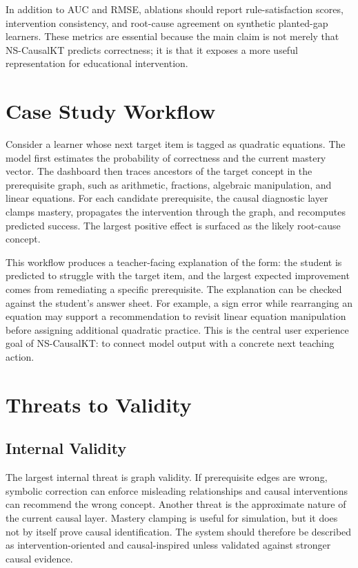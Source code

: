 \documentclass[conference]{IEEEtran}
\begin{document}
In addition to AUC and RMSE, ablations should report rule-satisfaction scores, intervention consistency, and root-cause agreement on synthetic planted-gap learners. These metrics are essential because the main claim is not merely that NS-CausalKT predicts correctness; it is that it exposes a more useful representation for educational intervention.

\section{Case Study Workflow}
Consider a learner whose next target item is tagged as quadratic equations. The model first estimates the probability of correctness and the current mastery vector. The dashboard then traces ancestors of the target concept in the prerequisite graph, such as arithmetic, fractions, algebraic manipulation, and linear equations. For each candidate prerequisite, the causal diagnostic layer clamps mastery, propagates the intervention through the graph, and recomputes predicted success. The largest positive effect is surfaced as the likely root-cause concept.

This workflow produces a teacher-facing explanation of the form: the student is predicted to struggle with the target item, and the largest expected improvement comes from remediating a specific prerequisite. The explanation can be checked against the student's answer sheet. For example, a sign error while rearranging an equation may support a recommendation to revisit linear equation manipulation before assigning additional quadratic practice. This is the central user experience goal of NS-CausalKT: to connect model output with a concrete next teaching action.

\section{Threats to Validity}
\subsection{Internal Validity}
The largest internal threat is graph validity. If prerequisite edges are wrong, symbolic correction can enforce misleading relationships and causal interventions can recommend the wrong concept. Another threat is the approximate nature of the current causal layer. Mastery clamping is useful for simulation, but it does not by itself prove causal identification. The system should therefore be described as intervention-oriented and causal-inspired unless validated against stronger causal evidence.
\end{document}
